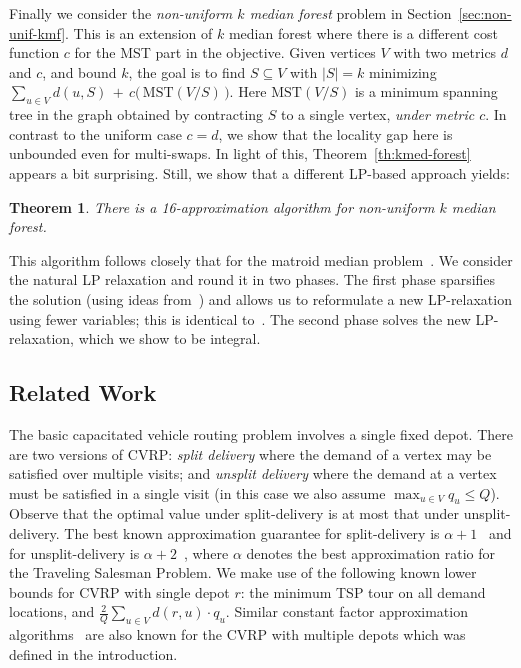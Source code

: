 \documentclass[11pt,twoside,a4paper]{article}
\newtheorem{theorem}{Theorem}
\newcommand{\sse}{\subseteq}
\begin{document}
Finally we consider the {\em non-uniform  $k$ median forest} problem in Section~\ref{sec:non-unif-kmf}. This is an
extension of $k$ median forest where there is a different cost function $c$ for the MST part in the objective. Given
vertices $V$ with two metrics $d$ and $c$, and bound $k$, the goal is to find $S\sse V$ with $|S|=k$ minimizing
$\sum_{u\in V} d(u,S) \, + \, c\big(\,\mbox{MST}(V/S)\,\big)$. Here $\mbox{MST}(V/S)$ is a minimum spanning tree in the
graph obtained by contracting $S$ to a single vertex, {\em under metric $c$}. In contrast to the uniform case $c=d$, we
show that the locality gap here is unbounded even for multi-swaps. In light of this, Theorem~\ref{th:kmed-forest}
appears a bit surprising. Still, we show that a different LP-based approach yields:
\begin{theorem}\label{th:gen-kmed-forest}
There is a 16-approximation algorithm for non-uniform $k$ median forest.
\end{theorem}
This algorithm follows closely that for the matroid median problem~\cite{KKNSS11}. We consider the natural LP
relaxation and round it in two phases. The first phase sparsifies the solution (using ideas from~\cite{CGTS99}) and
allows us to reformulate a new LP-relaxation using fewer variables; this is identical to~\cite{KKNSS11}. The second
phase solves the new LP-relaxation, which we show  to be integral.


\subsection{Related Work}
The basic capacitated vehicle routing problem involves a single fixed depot. There are two versions of CVRP: {\em split
delivery} where the demand of a vertex may be satisfied over multiple visits; and {\em unsplit delivery} where the
demand at a vertex must be satisfied in a single visit (in this case we also assume $\max_{u\in V} q_u\le Q$). Observe
that the optimal value under split-delivery is at most that under unsplit-delivery. The best known approximation
guarantee for split-delivery is $\alpha+1$~\cite{HK85,AG90} and for unsplit-delivery is $\alpha+2$~\cite{AG87}, where
$\alpha$ denotes the best approximation ratio for the Traveling Salesman Problem. We make use of the following known
lower bounds for CVRP with single depot $r$: the minimum TSP tour on all demand locations, and $\frac{2}Q\sum_{u\in V}
d(r,u)\cdot q_u$. Similar constant factor approximation algorithms~\cite{LS90} are also known for the CVRP with
multiple depots which was defined in the introduction.
\end{document}
